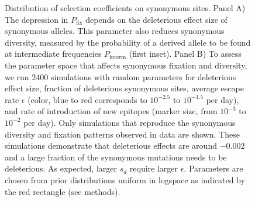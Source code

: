 \documentclass[10pt]{article}
\newcommand{\pfix}{P_{\mathrm{fix}}}
\begin{document}
\begin{figure}[!ht]
\begin{center}
\caption{Distribution of selection coefficients on synonymous sites. Panel A)
The depression in $\pfix$ depends on the deleterious effect size 
of synonymous alleles. This parameter also reduces synonymous
diversity, measured by the probability of a derived allele to be found at
intermediate frequencies $P_\text{interm}$ (first inset).
Panel B) To assess the parameter space that affects synonymous fixation and
diversity, we run 2400 simulations with random parameters for deleterious effect
size, fraction of deleterious synonymous sites, average escape rate $\epsilon$
(color, blue to red corresponds to $10^{-2.5}$ to $10^{-1.5}$ per day), and rate of
introduction of new epitopes (marker size, from $10^{-3}$ to $10^{-2}$ per
day). Only simulations that reproduce the synonymous diversity and fixation
patterns observed in data are shown. These simulations demonstrate that
deleterious effects are around $-0.002$ and a large fraction of the 
synonymous mutations needs to be deleterious. As expected, larger
$s_d$ require larger $\epsilon$. Parameters are chosen
from prior distributions uniform in logspace as indicated by the red rectangle
(see methods).}
\label{fig:simheat}
\end{center}
\end{figure}

%
\end{document}
